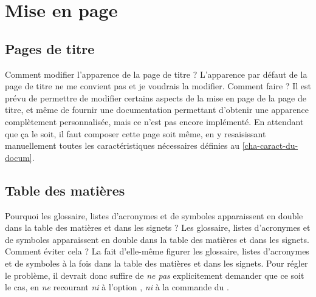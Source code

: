 
\section{Mise en page}
\label{sec-mise-en-page}

\subsection{Pages de titre}
\label{sec-pages-de-titre}
%
%

\begin{dbfaq}{Comment modifier l'apparence de la page de titre ?}{}
  L'apparence par défaut de la page de titre ne me convient pas et je voudrais
  la modifier. Comment faire ?
  \tcblower
  Il est prévu de permettre de modifier certains aspects de la mise en page de
  la page de titre, et même de fournir une documentation permettant d'obtenir
  une apparence complètement personnalisée, mais ce n'est pas encore
  implémenté.  En attendant que ça le soit, il faut composer cette page soit
  même, en y resaisissant manuellement toutes les caractéristiques nécessaires
  définies au \vref{cha-caract-du-docum}.
\end{dbfaq}

\subsection{Table des matières}
\label{sec-table-des-matieres-faq}

\begin{dbfaq}{Pourquoi les glossaire, listes d'acronymes et de symboles
    apparaissent en double dans la table des matières et dans les signets ?}{}
  Les glossaire, listes d'acronymes et de symboles apparaissent en double dans
  la table des matières et dans les signets. Comment éviter cela ?%
  \tcblower
  La \yatCl{} fait d'elle-même figurer les glossaire, listes d'acronymes et de
  symboles à la fois dans la table des matières et dans les signets. Pour
  régler le problème, il devrait donc suffire de \emph{ne pas} explicitement
  demander que ce soit le cas, en \emph{ne} recourant \emph{ni} à l'option
  , \emph{ni} à la commande  du
  .
\end{dbfaq}

